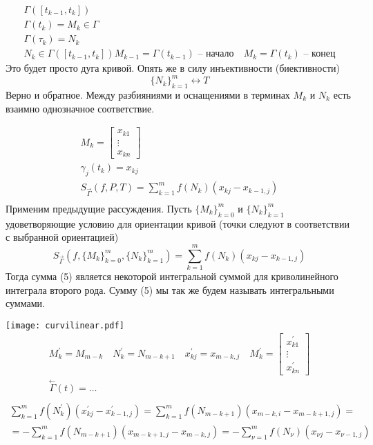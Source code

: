 \documentclass[main]{subfiles}
\begin{document}
\begin{definition}
    \begin{gather*}
        \Gamma([t_{k-1}, t_k]) \\
        \Gamma(t_k) = M_k \in \Gamma \\
        \Gamma(\tau_k) = N_k \\
        N_k \in \Gamma([t_{k-1},t_k])
        M_{k-1} = \Gamma(t_{k-1}) \text{ -- начало} \quad M_k = \Gamma(t_k) \text{ -- конец}
    \end{gather*}
    Это будет просто дуга кривой. Опять же в силу инъективности (биективности)
    \[ \{ N_k \}_{k=1}^m \leftrightarrow T \] Верно и обратное.
    Между разбияниями и оснащениями в терминах $M_k$ и $N_k$ есть взаимно однозначное соответствие.
\end{definition}

\begin{gather*}
    M_k = \begin{bmatrix*}
        x_{k1} \\
        \vdots \\
        x_{kn}
    \end{bmatrix*} \\
    \gamma_j(t_k) = x_{kj} \\
     S_{\stackrel{\rightarrow}{\Gamma}}(f,P,T) = \sum^m_{k=1} f(N_k)(x_{kj} - x_{k-1,j}) \tag{4} \\
\end{gather*}
Применим предыдущие рассуждения. Пусть $ \{ M_k \}^m_{k=0}$ и $\{ N_k \}^m_{k=1}$ удоветворяющие условию для ориентации кривой
(точки следуют в соответствии с выбранной ориентацией)
\[  S_{\stackrel{\rightarrow}{\Gamma}} (f,\{ M_k \}^m_{k=0},\{ N_k \}^m_{k=1} ) =  \sum^m_{k=1} f(N_k)(x_{kj} - x_{k-1,j}) \tag{5} \]
Тогда сумма (5) является некоторой интегральной суммой для криволинейного интеграла второго рода.
Сумму (5) мы так же будем называть интегральными суммами.


\texttt{[image: curvilinear.pdf]}
\begin{gather*}
    M^\prime_k = M_{m-k} \quad N^\prime_k = N_{m-k+1} \quad x^\prime_{kj} = x_{m-k,j}  \quad M^\prime_k= \begin{bmatrix*}
        x^\prime_{k1} \\
        \vdots \\
        x^\prime_{kn}
    \end{bmatrix*}\\
    \stackrel{\leftarrow}{\Gamma}(t) = \ldots \\ 
\end{gather*}
\begin{multline*}
    \sum^m_{k=1} f(N^\prime_k)(x^\prime_{kj} - x^\prime_{k-1,j}) = \sum^m_{k=1}f(N_{m-k+1})(x_{m-k,i} - x_{m-k+1,j}) =\\
    = - \sum^m_{k=1} f(N_{m-k+1})(x_{m-k+1,j} - x_{m-k,j}) = -\sum^m_{\nu = 1}f(N_\nu) (x_{\nu j} - x_{\nu -1,j}) \tag{6}
\end{multline*}
\end{document}
